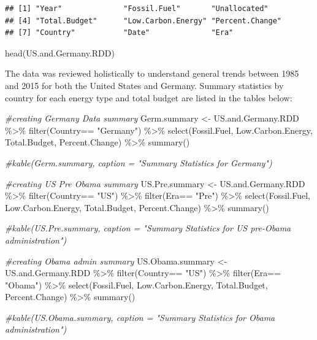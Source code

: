 \documentclass[
  12pt,
]{article}
\newenvironment{Shaded}{\begin{snugshade}}{\end{snugshade}}
\newcommand{\CommentTok}[1]{\textcolor[rgb]{0.56,0.35,0.01}{\textit{#1}}}
\newcommand{\FunctionTok}[1]{\textcolor[rgb]{0.00,0.00,0.00}{#1}}
\newcommand{\NormalTok}[1]{#1}
\newcommand{\OtherTok}[1]{\textcolor[rgb]{0.56,0.35,0.01}{#1}}
\newcommand{\SpecialCharTok}[1]{\textcolor[rgb]{0.00,0.00,0.00}{#1}}
\newcommand{\StringTok}[1]{\textcolor[rgb]{0.31,0.60,0.02}{#1}}
\begin{document}
\begin{verbatim}
## [1] "Year"              "Fossil.Fuel"       "Unallocated"      
## [4] "Total.Budget"      "Low.Carbon.Energy" "Percent.Change"   
## [7] "Country"           "Date"              "Era"
\end{verbatim}

\begin{Shaded}
\begin{Highlighting}[]
\FunctionTok{head}\NormalTok{(US.and.Germany.RDD)}
\end{Highlighting}
\end{Shaded}

The data was reviewed holistically to understand general trends between
1985 and 2015 for both the United States and Germany. Summary statistics
by country for each energy type and total budget are listed in the
tables below:

\begin{Shaded}
\begin{Highlighting}[]
\CommentTok{\#creating Germany Data summary}
\NormalTok{Germ.summary }\OtherTok{\textless{}{-}}\NormalTok{ US.and.Germany.RDD }\SpecialCharTok{\%\textgreater{}\%}
  \FunctionTok{filter}\NormalTok{(Country}\SpecialCharTok{==} \StringTok{"Germany"}\NormalTok{) }\SpecialCharTok{\%\textgreater{}\%}
  \FunctionTok{select}\NormalTok{(Fossil.Fuel, Low.Carbon.Energy, Total.Budget, Percent.Change) }\SpecialCharTok{\%\textgreater{}\%}
  \FunctionTok{summary}\NormalTok{()}

\CommentTok{\#kable(Germ.summary, caption = "Summary Statistics for Germany")}

\CommentTok{\#creating US Pre Obama summary}
\NormalTok{US.Pre.summary }\OtherTok{\textless{}{-}}\NormalTok{ US.and.Germany.RDD }\SpecialCharTok{\%\textgreater{}\%}
  \FunctionTok{filter}\NormalTok{(Country}\SpecialCharTok{==} \StringTok{"US"}\NormalTok{) }\SpecialCharTok{\%\textgreater{}\%}
  \FunctionTok{filter}\NormalTok{(Era}\SpecialCharTok{==} \StringTok{"Pre"}\NormalTok{) }\SpecialCharTok{\%\textgreater{}\%}
  \FunctionTok{select}\NormalTok{(Fossil.Fuel, Low.Carbon.Energy, Total.Budget, Percent.Change) }\SpecialCharTok{\%\textgreater{}\%}
  \FunctionTok{summary}\NormalTok{()}

\CommentTok{\#kable(US.Pre.summary, caption = "Summary Statistics for US pre{-}Obama administration")}

\CommentTok{\#creating Obama admin summary}
\NormalTok{US.Obama.summary }\OtherTok{\textless{}{-}}\NormalTok{ US.and.Germany.RDD }\SpecialCharTok{\%\textgreater{}\%}
  \FunctionTok{filter}\NormalTok{(Country}\SpecialCharTok{==} \StringTok{"US"}\NormalTok{) }\SpecialCharTok{\%\textgreater{}\%}
  \FunctionTok{filter}\NormalTok{(Era}\SpecialCharTok{==} \StringTok{"Obama"}\NormalTok{) }\SpecialCharTok{\%\textgreater{}\%}
  \FunctionTok{select}\NormalTok{(Fossil.Fuel, Low.Carbon.Energy, Total.Budget, Percent.Change) }\SpecialCharTok{\%\textgreater{}\%}
  \FunctionTok{summary}\NormalTok{()}

\CommentTok{\#kable(US.Obama.summary, caption = "Summary Statistics for Obama administration")}
\end{Highlighting}
\end{Shaded}
\end{document}
